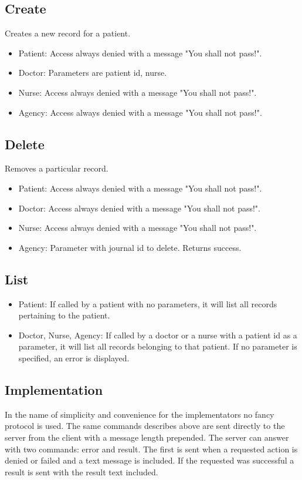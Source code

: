 \documentclass[10pt, a4paper]{article}
\begin{document}
\subsection{Create}
Creates a new record for a patient.
\begin{itemize}
\item Patient: Access always denied with a message "You shall not pass!".
\item Doctor: Parameters are patient id, nurse.
\item Nurse: Access always denied with a message "You shall not pass!".
\item Agency: Access always denied with a message "You shall not pass!".
\end{itemize}

\subsection{Delete}
Removes a particular record.
\begin{itemize}
\item Patient: Access always denied with a message "You shall not pass!".
\item Doctor: Access always denied with a message "You shall not pass!".
\item Nurse: Access always denied with a message "You shall not pass!".
\item Agency: Parameter with journal id to delete. Returns success.
\end{itemize}

\subsection{List}
\begin{itemize}
\item Patient: If called by a patient with no parameters, it will list all records pertaining to the patient.
\item Doctor, Nurse, Agency: If called by a doctor or a nurse with a patient id as a parameter, it will list all records belonging to that patient. If no parameter is specified, an error is displayed.
\end{itemize}

\subsection{Implementation}
In the name of simplicity and convenience for the implementators no fancy protocol is used. The same commands describes above are sent directly to the server from the client with a message length prepended. The server can answer with two commands: error and result. The first is sent when a requested action is denied or failed and a text message is included. If the requested was successful a result is sent with the result text included.
\end{document}
